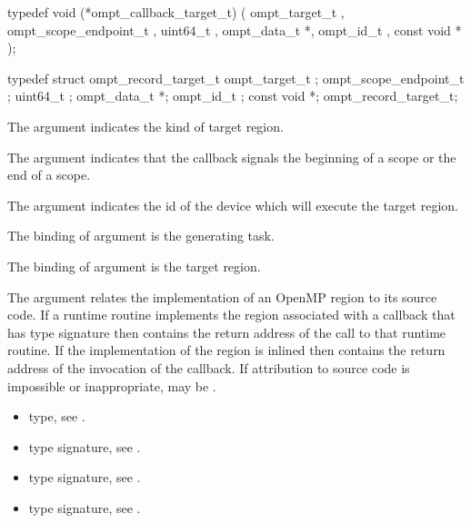 \format

\begin{ccppspecific}
\begin{omptCallback}
typedef void (*ompt_callback_target_t) (
  ompt_target_t ,
  ompt_scope_endpoint_t ,
  uint64_t ,
  ompt_data_t *,
  ompt_id_t ,
  const void *
);
\end{omptCallback}
\end{ccppspecific}


\record

\begin{ccppspecific}
\begin{omptRecord}
typedef struct ompt_record_target_t {
  ompt_target_t ;
  ompt_scope_endpoint_t ;
  uint64_t ;
  ompt_data_t *;
  ompt_id_t ;
  const void *;
} ompt_record_target_t;
\end{omptRecord}
\end{ccppspecific}


\argdesc

The argument  indicates the kind of target region.

The  argument indicates that the callback signals
the beginning of a scope or the end of a scope.

The argument  indicates the id of the device
which will execute the target region.

The binding of argument  is the generating task.

The binding of argument  is the target region.

The  argument relates the implementation of an OpenMP region
to its source code. If a runtime routine implements the region associated with
a callback that has type signature  then
 contains the return address of the call to that runtime routine.
If the implementation of the region is inlined then  contains the
return address of the invocation of the callback. If attribution to source code
is impossible or inappropriate, may be .

\crossreferences
\begin{itemize}
\item {} type, see
.
\item {} type signature, see
.
\item {} type signature, see
.
\item {} type signature, see
.
\end{itemize}

